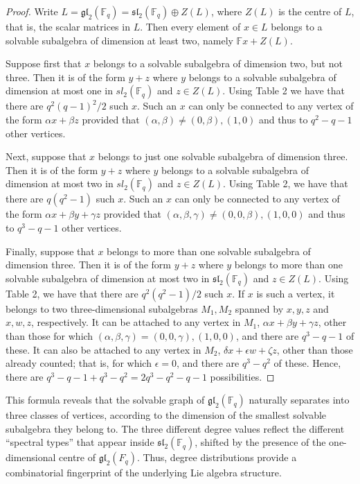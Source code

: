\documentclass[11pt]{amsart}
\theoremstyle{plain}
\def\F{\mathbb{F}}
\begin{document}
\begin{proof}  
Write $L= \mathfrak{gl}_2(\F_q)= \mathfrak{sl}_2(\F_q)\oplus Z(L)$, where $Z(L)$ is the centre of $L$, that is, the scalar matrices in $L$.  Then every element of $x\in L$ belongs to a solvable subalgebra of dimension at least two, namely $\F x+Z(L)$. 
\par

Suppose first that $x$ belongs to a solvable subalgebra of dimension two, but not three. Then it is of the form $y + z$ where $y$ belongs to a solvable subalgebra of dimension at most one in $sl_2(\F_q)$ and $z \in Z(L)$. Using Table 2 we have that there are $q^2(q-1)^2/2$ such $x$. Such an $x$ can only be connected to any vertex of the form $\alpha x + \beta z$ provided that $(\alpha,\beta) \neq (0,\beta), (1,0)$ and thus to $q^2-q-1$ other vertices.
\par

Next, suppose that $x$ belongs to just one solvable subalgebra of dimension three. Then it is of the form $y + z$ where $y$ belongs to a solvable subalgebra of dimension at most two in $sl_2(\F_q)$ and $z \in Z(L)$. Using Table 2, we have that there are $q(q^2-1)$ such $x$. Such an $x$ can only be connected to any vertex of the form $\alpha x+\beta y + \gamma z$ provided that $(\alpha,\beta,\gamma) \neq (0,0,\beta), (1,0,0)$ and thus to $q^3-q-1$ other vertices.
\par

Finally, suppose that $x$ belongs to more than one solvable subalgebra of dimension three. Then it is of the form $y+z$ where $y$ belongs to more than one solvable subalgebra of dimension at most two in $\mathfrak{sl}_2(\F_q)$ and $z \in Z(L)$. 
Using Table 2, we have that there are $q^2(q^2-1)/2$ such $x$. If $x$ is such a vertex, it belongs to two three-dimensional subalgebras $M_1, M_2$ spanned by $x,y,z$ and $x,w,z$, respectively. It can be attached to any vertex in $M_1$, $\alpha x+\beta y+\gamma z$, other than those for which $(\alpha,\beta,\gamma)=(0,0,\gamma),(1,0,0)$, and there are $q^3-q-1$ of these. It can also be attached to any vertex in $M_2$, $\delta x+\epsilon w +\zeta z$, other than those already counted; that is, for which $\epsilon =0$, and there are $q^3-q^2$ of these. Hence, there are $q^3-q-1+q^3-q^2=2q^3-q^2-q-1$ possibilities.
\end{proof}

This formula reveals that the solvable graph of $\mathfrak{gl}_2(\F_q)$ naturally separates into three classes of vertices, according to the dimension of the smallest solvable subalgebra they belong to. The three different degree values reflect the different ``spectral types'' that appear inside $\mathfrak{sl}_2(\F_q)$, shifted by the presence of the one-dimensional centre of $\mathfrak{gl}_2(F_q)$. 
Thus, degree distributions provide a combinatorial fingerprint of the underlying Lie algebra structure.
\end{document}
